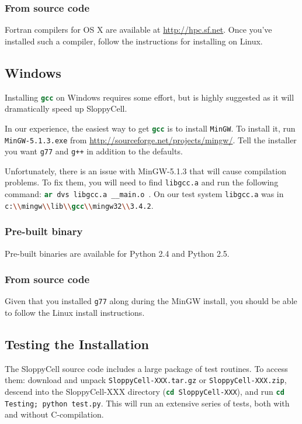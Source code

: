 \documentclass[12pt]{article}
\newcommand{\shell}[1]{\lstinline[language=csh, showstringspaces=False]!#1!}
\begin{document}
\subsubsection{From source code}
Fortran compilers for OS X are available at  \url{http://hpc.sf.net}. Once you've installed 
such a compiler, follow the instructions for installing on Linux.

\subsection{Windows}
Installing \shell{gcc} on Windows requires some effort, but is highly suggested as it will dramatically speed up SloppyCell.

In our experience, the easiest way to get \shell{gcc} is to install \shell{MinGW}.
To install it, run \shell{MinGW-5.1.3.exe} from
\url{http://sourceforge.net/projects/mingw/}.
Tell the installer you want \shell{g77} and \shell{g++} in addition to the defaults.

Unfortunately, there is an issue with MinGW-5.1.3 that will cause compilation problems. To fix them, you will need to find \shell{libgcc.a} and run the following command:
\shell{ar dvs libgcc.a __main.o}~\cite{bib:SCuser:ar}.
On our test system \shell{libgcc.a} was in \shell{c:\\mingw\\lib\\gcc\\mingw32\\3.4.2}.

\subsubsection{Pre-built binary}
Pre-built binaries are available for Python 2.4 and Python 2.5.

\subsubsection{From source code}
Given that you installed \shell{g77} along during the MinGW install, you should be able to follow the Linux install instructions.

\subsection{Testing the Installation}\label{sec:test}
The SloppyCell source code includes a large package of test routines.
To access them: download and unpack \shell{SloppyCell-XXX.tar.gz} or \shell{SloppyCell-XXX.zip}, descend into the SloppyCell-XXX directory (\shell{cd SloppyCell-XXX}), and run \shell{cd Testing; python test.py}.
This will run an extensive series of tests, both with and without C-compilation.
\end{document}
